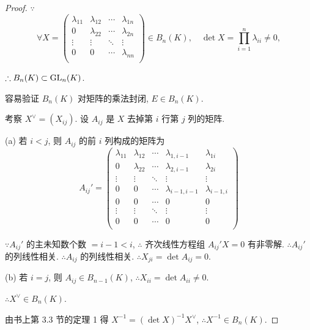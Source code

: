 \documentclass[color=black,device=normal,lang=cn,mode=geye]{elegantnote}
\begin{document}
\begin{proof}
    $\because$
    \[\forall X=\begin{pmatrix}
        \lambda_{11} & \lambda_{12} & \cdots & \lambda_{1n} \\
        0 & \lambda_{22} & \cdots & \lambda_{2n} \\
        \vdots & \vdots & \ddots & \vdots \\
        0 & 0 & \cdots & \lambda_{nn} \\
    \end{pmatrix}\in B_n(K),\quad\det X=\prod\limits_{i=1}^n\lambda_{ii}\neq0,\]

    $\therefore B_n(K)\subset\operatorname{GL} _n(K)$.

    容易验证 $B_n(K)$ 对矩阵的乘法封闭, $E\in B_n(K)$.

    考察 $X^\vee=(X_{ij})$. 设 $A_{ij}$ 是 $X$ 去掉第 $i$ 行第 $j$ 列的矩阵.
    
    (a) 若 $i<j$, 则 $A_{ij}$ 的前 $i$ 列构成的矩阵为
    \[A_{ij}'=\begin{pmatrix}
        \lambda_{11} & \lambda_{12} & \cdots & \lambda_{1,i-1} & \lambda_{1i} \\
        0 & \lambda_{22} & \cdots & \lambda_{2,i-1} & \lambda_{2i} \\
        \vdots & \vdots & \ddots & \vdots & \vdots \\
        0 & 0 & \cdots & \lambda_{i-1,i-1} & \lambda_{i-1,i} \\
        0 & 0 & \cdots & 0 & 0 \\
        \vdots & \vdots & \ddots & \vdots & \vdots \\
        0 & 0 & \cdots & 0 & 0 \\
    \end{pmatrix}\]

    $\because A_{ij}'$ 的主未知数个数 $=i-1<i$, $\therefore$ 齐次线性方程组 $A_{ij}'X=0$ 有非零解. $\therefore A_{ij}'$ 的列线性相关. $\therefore A_{ij}$ 的列线性相关. $\therefore X_{ji}=\det A_{ij}=0$.

    (b) 若 $i=j$, 则 $A_{ij}\in B_{n-1}(K)$, $\therefore X_{ii}=\det A_{ii}\neq0$.
    
    $\therefore X^\vee\in B_n(K)$.

    由书上第 3.3 节的定理 1 得 $X^{-1}=(\det X)^{-1}X^\vee$, $\therefore X^{-1}\in B_n(K)$.
\end{proof}
\end{document}
